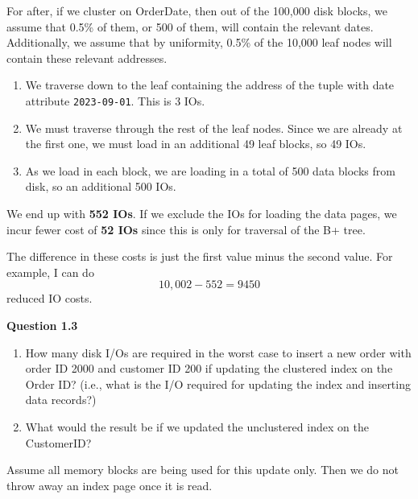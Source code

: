 \begin{example}
    For after, if we cluster on OrderDate, then out of the 100,000 disk blocks, we assume that 0.5\% of them, or 500 of them, will contain the relevant dates. Additionally, we assume that by uniformity, 0.5\% of the 10,000 leaf nodes will contain these relevant addresses. 
    \begin{enumerate}
      \item We traverse down to the leaf containing the address of the tuple with date attribute \texttt{2023-09-01}. This is 3 IOs. 
      \item We must traverse through the rest of the leaf nodes. Since we are already at the first one, we must load in an additional 49 leaf blocks, so 49 IOs. 
      \item As we load in each block, we are loading in a total of 500 data blocks from disk, so an additional 500 IOs. 
    \end{enumerate}
    We end up with \textbf{552 IOs}. If we exclude the IOs for loading the data pages, we incur fewer cost of \textbf{52 IOs} since this is only for traversal of the B+ tree. 

    The difference in these costs is just the first value minus the second value. For example, I can do 
    \begin{equation}
      10,002 - 552 = 9450
    \end{equation}
    reduced IO costs. 


    \vspace{1em}
    \noindent\textbf{Question 1.3}
    \begin{enumerate}[label=(\alph*)]
      \item How many disk I/Os are required in the worst case to insert a new order with order ID 2000 and customer ID 200 if updating the clustered index on the Order ID? (i.e., what is the I/O required for updating the index and inserting data records?)
      \item What would the result be if we updated the unclustered index on the CustomerID?
    \end{enumerate}

    Assume all memory blocks are being used for this update only. Then we do not throw away an index page once it is read.


\end{example}
